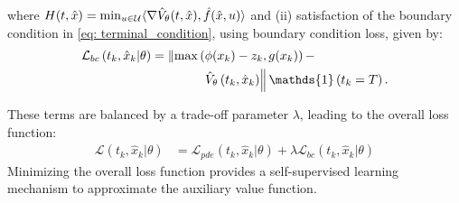 where $H(t,\hat{x}) = \min_{u\in \mathcal{U}} \langle\nabla \hat{V}_{\theta}(t, \hat{x}), \hat{f}(\hat{x}, u)\rangle $ and (ii) satisfaction of the boundary condition in \eqref{eq: terminal_condition}, using boundary condition loss, given by:
\begin{equation}
\begin{aligned}
\mathcal{L}_{bc}\left(t_k, \hat{x}_k | \theta\right)&=\left\|\max\left(\phi(x_k) - z_k, g(x_k)\right) -\right. \\
& \qquad \qquad \left.\learnedauxvfunc\left(t_k, \hat{x}_k \right)\right\| \mathds{1}\left(t_k=T\right).
\end{aligned}
\end{equation}


These terms are balanced by a trade-off parameter $\lambda$, leading to the overall loss function:
\begin{equation}
\label{eq: piml_co-opt_loss}
\begin{aligned}
 \mathcal{L}\left(t_k, \hat{x}_k | \theta\right)&=\mathcal{L}_{pde}\left(t_k, \hat{x}_k | \theta\right)+\lambda \mathcal{L}_{bc}\left(t_k, \hat{x}_k | \theta\right)
\end{aligned}
\end{equation}
% 
Minimizing the overall loss function provides a self-supervised learning mechanism to approximate the auxiliary value function.
\vspace{-0.5em}
